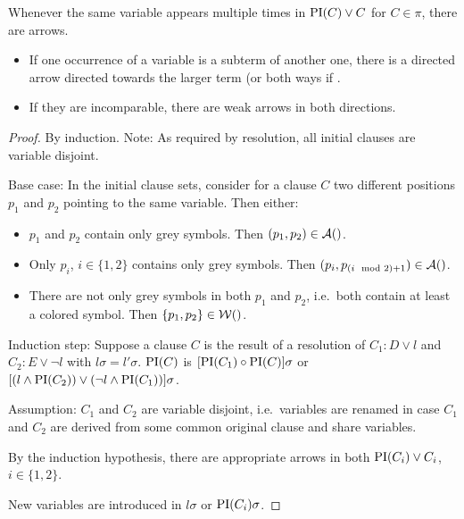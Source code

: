 \documentclass[,%
	paper=a4,%
	DIV14, 
	liststotoc,
	bibtotoc,
	draft=false,%
	numbers=noendperiod
]{scrartcl}
\begin{document}
\begin{lemma}
	\label{lemma:arrow_for_same_variables}
	Whenever the same variable appears multiple times in $\operatorname{PI}(C)\lor C$ for $C \in \pi$, there are arrows. 

	\begin{itemize}
		\item If one occurrence of a variable is a subterm of another one, there is a directed arrow directed towards the larger term (or both ways if .
		\item If they are incomparable, there are weak arrows in both directions.
	\end{itemize}
\end{lemma}
\begin{proof}
	By induction. Note: As required by resolution, all initial clauses are variable disjoint.

	Base case:
	In the initial clause sets, consider for a clause $C$ two different positions $p_1$ and $p_2$ pointing to the same variable. 
	Then either:
	\begin{itemize}
		\item $p_1$ and $p_2$ contain only grey symbols. Then $(p_1, p_2) \in \arr$.
		\item Only $p_i$, $i\in\{1,2\}$ contains only grey symbols. Then $(p_i, p_{(i \mod 2)+1}) \in \arr$.
		\item There are not only grey symbols in both $p_1$ and $p_2$, i.e.~both contain at least a colored symbol. Then $\{p_1, p_2\} \in \warr$. 
	\end{itemize}

	Induction step:
	      Suppose a clause $C$ is the result of a resolution of $C_1: D \lor l$ and $C_2: E \lor \lnot l$ with $l\sigma = l'\sigma$.
	$\operatorname{PI}(C)$ is $[\operatorname{PI}(C_1) \circ \operatorname{PI}(C)]\sigma$ or $[(l \land \operatorname{PI}(C_2)) \lor (\lnot l \land \operatorname{PI}(C_1)) ] \sigma $.

	Assumption: $C_1$ and $C_2$ are variable disjoint, i.e.~variables are renamed in case $C_1$ and $C_2$ are derived from some common original clause and share variables.

	By the induction hypothesis, there are appropriate arrows in both $\operatorname{PI}(C_i) \lor C_i$, $i \in \{1,2\}$.

	New variables are introduced in $l\sigma$ or $\operatorname{PI}(C_i)\sigma$.
	







\end{proof}
\end{document}
